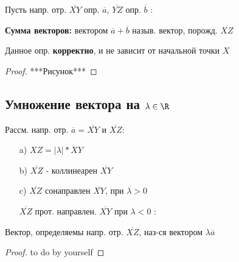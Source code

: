 \begin{definition}
Пусть напр. отр. $\overline{XY}$ опр. $\overline{a}$, $\overline{YZ}$ опр. $\overline{b}$ :

\textbf{Сумма векторов:} вектором $\overline{a} + \overline{b}$  назыв. вектор, порожд. $\overline{XZ}$
\end{definition}
\begin{note}
Данное опр. \textbf{корректно}, и не зависит от начальной точки $X$
\end{note}
\begin{proof}
***Рисунок***
\end{proof}

\subsection{Умножение вектора на $\lambda \in \R$}
Рассм. напр. отр. $\overline{a} = \overline{XY}$ и $\overline{XZ} \colon $
\begin{itemize}
    \item [a) ] $XZ = |\lambda| * XY$ 
    \item [b) ] $\overline{XZ}$ - коллинеарен $\overline{XY}$ 
    \item [c) ] $\overline{XZ}$ сонаправлен $\overline{XY}$, при $\lambda > 0$ 

        $\overline{XZ}$ прот. направлен. $\overline{XY}$ при $\lambda < 0$ :
\end{itemize}

Вектор, определяемы напр. отр. $\overline{XZ}$, наз-ся вектором $\lambda \overline{a}$ 

\begin{proof}
to do by yourself
\end{proof}

